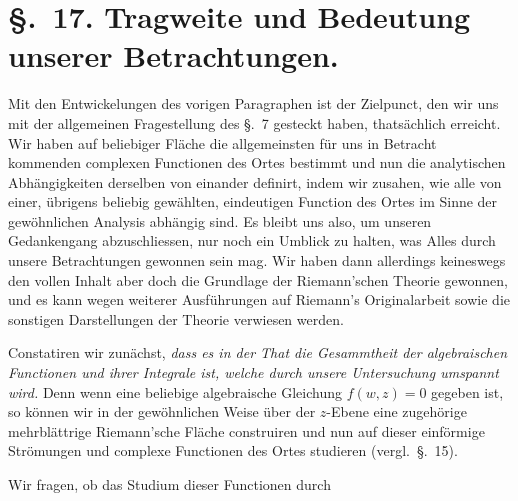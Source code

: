 \documentclass{article}
\begin{document}
\section*{§.~17. Tragweite und Bedeutung unserer Betrachtungen.}

Mit den Entwickelungen des vorigen Paragraphen ist der Zielpunct, den wir uns mit der allgemeinen Fragestellung des §.~7 gesteckt haben, thatsächlich erreicht. Wir haben auf beliebiger Fläche die allgemeinsten für uns in Betracht kommenden complexen Functionen des Ortes bestimmt und nun die analytischen Abhängigkeiten derselben von einander definirt, indem wir zusahen, wie alle von einer, übrigens beliebig gewählten, eindeutigen Function des Ortes im Sinne der gewöhnlichen Analysis abhängig sind. Es bleibt uns also, um unseren Gedankengang abzuschliessen, nur noch ein Umblick zu halten, was Alles durch unsere Betrachtungen gewonnen sein mag. Wir haben dann allerdings keineswegs den vollen Inhalt aber doch die Grundlage der Riemann'schen Theorie gewonnen, und es kann wegen weiterer Ausführungen auf Riemann's Originalarbeit sowie die sonstigen Darstellungen der Theorie verwiesen werden.

Constatiren wir zunächst, \emph{dass es in der That die Gesammtheit der algebraischen Functionen und ihrer Integrale ist, welche durch unsere Untersuchung umspannt wird.} Denn wenn eine beliebige algebraische Gleichung $f(w, z) = 0$ gegeben ist, so können wir in der gewöhnlichen Weise über der $z$-Ebene eine zugehörige mehrblättrige Riemann'sche Fläche construiren und nun auf dieser einförmige Strömungen und complexe Functionen des Ortes studieren (vergl.\ §.~15).

Wir fragen, ob das Studium dieser Functionen durch
\end{document}
